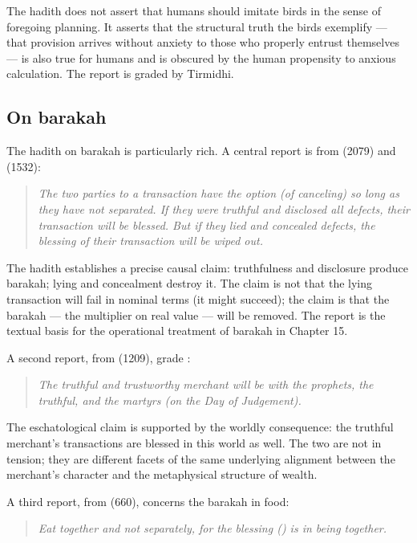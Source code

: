 The hadith does not assert that humans should imitate birds in the
sense of foregoing planning. It asserts that the structural truth
the birds exemplify --- that provision arrives without anxiety to
those who properly entrust themselves --- is also true for humans
and is obscured by the human propensity to anxious calculation. The
report is graded  by Tirmidhi.

\subsection{On barakah}

The hadith on barakah is particularly rich. A central report is from
 (2079) and  (1532):

\begin{quote}
\textit{The two parties to a transaction have the option (of
canceling) so long as they have not separated. If they were truthful
and disclosed all defects, their transaction will be blessed. But if
they lied and concealed defects, the blessing of their transaction
will be wiped out.}
\end{quote}

The hadith establishes a precise causal claim: truthfulness and
disclosure produce barakah; lying and concealment destroy it. The
claim is not that the lying transaction will fail in nominal terms
(it might succeed); the claim is that the barakah --- the multiplier
on real value --- will be removed. The report is the textual basis
for the operational treatment of barakah in Chapter 15.

A second report, from  (1209), grade :

\begin{quote}
\textit{The truthful and trustworthy merchant will be with the
prophets, the truthful, and the martyrs (on the Day of Judgement).}
\end{quote}

The eschatological claim is supported by the worldly consequence: the
truthful merchant's transactions are blessed in this world as well.
The two are not in tension; they are different facets of the same
underlying alignment between the merchant's character and the
metaphysical structure of wealth.

A third report, from  (660), concerns the
barakah in food:

\begin{quote}
\textit{Eat together and not separately, for the blessing
() is in being together.}
\end{quote}

